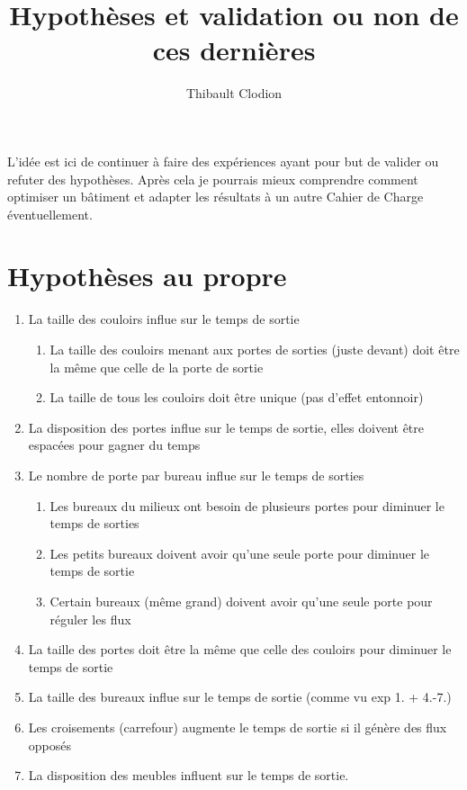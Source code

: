 \documentclass[12pt]{article}
\title{Hypothèses et validation ou non de ces dernières}
\author{Thibault Clodion}
\begin{document}
\maketitle %

L'idée est ici de continuer à faire des expériences ayant pour but de valider ou refuter des hypothèses.
Après cela je pourrais mieux comprendre comment optimiser un bâtiment et adapter les résultats à un autre Cahier de Charge éventuellement.

\section{Hypothèses au propre}

\begin{enumerate}
    \item La taille des couloirs influe sur le temps de sortie
    \begin{enumerate}
        \item La taille des couloirs menant aux portes de sorties (juste devant) doit être la même que celle de la porte de sortie
        \item La taille de tous les couloirs doit être unique (pas d'effet entonnoir)
    \end{enumerate}

    \item La disposition des portes influe sur le temps de sortie, elles doivent être espacées pour gagner du temps

    \item Le nombre de porte par bureau influe sur le temps de sorties
    \begin{enumerate}
        \item Les bureaux du milieux ont besoin de plusieurs portes pour diminuer le temps de sorties
        \item Les petits bureaux doivent avoir qu'une seule porte pour diminuer le temps de sortie
        \item Certain bureaux (même grand) doivent avoir qu'une seule porte pour réguler les flux
    \end{enumerate}

    \item La taille des portes doit être la même que celle des couloirs pour diminuer le temps de sortie


    \item La taille des bureaux influe sur le temps de sortie (comme vu exp 1. + 4.-7.)
    
    \item Les croisements (carrefour) augmente le temps de sortie si il génère des flux opposés
    
    \item La disposition des meubles influent sur le temps de sortie.

\end{enumerate}
\end{document}
